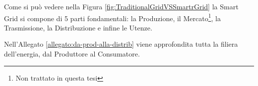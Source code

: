 

Come si può vedere nella Figura \ref{fig:TraditionalGridVSSmartrGrid} la Smart Grid si compone di 5 parti fondamentali: la Produzione, il Mercato\footnote{Non trattato in questa tesi}, la Trasmissione, la Distribuzione e infine le Utenze.

Nell'Allegato \ref{allegato:da-prod-alla-distrib} viene approfondita tutta la filiera  dell'energia, dal Produttore al Consumatore.








